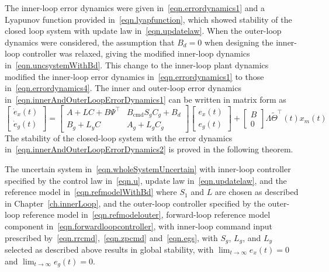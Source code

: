 The inner-loop error dynamics were given in\ \eqref{eqn.errordynamics1} and a Lyapunov function provided in\ \eqref{eqn.lyapfunction}, which showed stability of the closed loop system with update law in\ \eqref{eqn.updatelaw}.
When the outer-loop dynamics were considered, the assumption that $B_{d}=0$ when designing the inner-loop controller was relaxed, giving the modified inner-loop dynamics in\ \eqref{eqn.uncsystemWithBd}.
This change to the inner-loop plant dynamics modified the inner-loop error dynamics in\ \eqref{eqn.errordynamics1} to those in\ \eqref{eqn.errordynamics4}.
The inner and outer-loop error dynamics in\ \eqref{eqn.innerAndOuterLoopErrorDynamics1} can be written in matrix form as
\begin{equation}
  \label{eqn.innerAndOuterLoopErrorDynamics2}
  \begin{bmatrix}
    \dot{e}_{x}(t) \\
    \dot{e}_{g}(t)
  \end{bmatrix}
  =
  \begin{bmatrix}
    A+LC+B\Psi^{\top} & B_{\text{cmd}}S_{g}C_{g} + B_{d} \\
    B_{g}+L_{y}C & A_{g}+L_{g}C_{g}
  \end{bmatrix}
  \begin{bmatrix}
    e_{x}(t) \\
    e_{g}(t)
  \end{bmatrix}
  +
  \begin{bmatrix}
    B \\
    0
  \end{bmatrix}
  \Lambda\widetilde{\Theta}^{\top}(t)x_{m}(t)
\end{equation}
The stability of the closed-loop system with the error dynamics in\ \eqref{eqn.innerAndOuterLoopErrorDynamics2} is proved in the following theorem.

\begin{thm-dan}\label{thm.outerloop}
  The uncertain system in\ \eqref{eqn.wholeSystemUncertain} with inner-loop controller specified by the control law in\ \eqref{eqn.u}, update law in\ \eqref{eqn.updatelaw}, and the reference model in\ \eqref{eqn.refmodelWithBd} where $S_{1}$ and $L$ are chosen as described in Chapter~\ref{ch.innerLoop}, and the outer-loop controller specified by the outer-loop reference model in\ \eqref{eqn.refmodelouter}, forward-loop reference model component in\ \eqref{eqn.forwardloopcontroller}, with inner-loop command input prescribed by\ \eqref{eqn.rrcmd},\ \eqref{eqn.zpcmd} and\ \eqref{eqn.egs}, with $S_{g}$, $L_{g}$, and $L_{y}$ selected as described above results in global stability, with $\lim_{t\rightarrow\infty}e_{x}(t)=0$ and $\lim_{t\rightarrow\infty}e_{g}(t)=0$.
\end{thm-dan}

